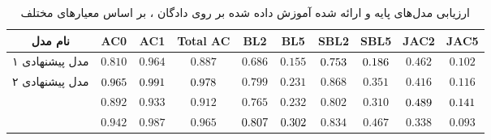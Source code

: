 \begin{table}[!htb]
	\centering
	\caption{
		ارزیابی مدل‌های پایه و ارائه شده آموزش داده شده بر روی دادگان ، بر اساس معیار‌های مختلف}
	\label{table:yelp_result}
	\small\tabcolsep=0.07cm
	\begin{tabular}{||c||c c c|c c|c c|c c||}\hline\hline نام مدل & AC0                        & AC1                        & Total AC                   & BL2                        & BL5                        & SBL2                       & SBL5                       & JAC2                       & JAC5                       \\
		\hline\hline
		مدل پیشنهادی ۱
		                                               & $0.810$                    & $0.964$                    & $0.887$                    & $0.686$                    & $0.155$                    & $\cellcolor{gray!25}0.753$ & $\cellcolor{gray!25}0.186$ & $0.462$                    & $0.102$                    \\
		\hline
		مدل پیشنهادی ۲
		                                               & $\cellcolor{gray!25}0.965$ & $\cellcolor{gray!25}0.991$ & $\cellcolor{gray!25}0.978$ & $0.799$                    & $0.231$                    & $0.868$                    & $0.351$                    & $0.416$                    & $0.116$                    \\
		\hline
		\towardctg{}                                   & $0.892$                    & $0.933$                    & $0.912$                    & $0.765$                    & $0.232$                    & $0.802$                    & $0.310$                    & $\cellcolor{gray!25}0.489$ & $\cellcolor{gray!25}0.141$ \\
		\hline
		\sentigan{}                                    & $0.942$                    & $0.987$                    & $0.965$                    & $\cellcolor{gray!25}0.807$ & $\cellcolor{gray!25}0.302$ & $0.834$                    & $0.467$                    & $0.338$                    & $0.093$                    \\
		\hline
		\hline\end{tabular}\normalsize
\end{table}

